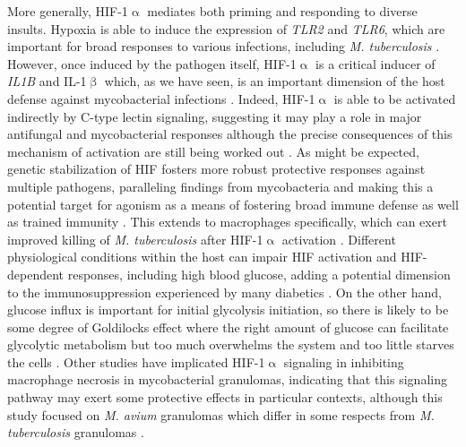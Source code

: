 More generally, HIF\hyp{}1$\upalpha$ mediates both priming and responding to diverse insults. Hypoxia is able to induce the expression of \textit{TLR2} and \textit{TLR6}, which are important for broad responses to various infections, including \textit{M. tuberculosis} \citep{Kuhlicke2007}. However, once induced by the pathogen itself, HIF\hyp{}1$\upalpha$ is a critical inducer of \textit{IL1B} and IL\hyp{}1$\upbeta$ which, as we have seen, is an important dimension of the host defense against mycobacterial infections \citep{Ogryzko2019}. Indeed, HIF\hyp{}1$\upalpha$ is able to be activated indirectly by C\hyp{}type lectin signaling, suggesting it may play a role in major antifungal and mycobacterial responses although the precise consequences of this mechanism of activation are still being worked out \citep{Friedrich2017, Elder2019}. As might be expected, genetic stabilization of HIF fosters more robust protective responses against multiple pathogens, paralleling findings from mycobacteria and making this a potential target for agonism as a means of fostering broad immune defense as well as trained immunity \citep{Schild2020}. This extends to macrophages specifically, which can exert improved killing of \textit{M. tuberculosis} after HIF\hyp{}1$\upalpha$ activation \citep{Li2021}. Different physiological conditions within the host can impair HIF activation and HIF\hyp{}dependent responses, including high blood glucose, adding a potential dimension to the immunosuppression experienced by many diabetics \citep{Teran2022}. On the other hand, glucose influx is important for initial glycolysis initiation, so there is likely to be some degree of Goldilocks effect where the right amount of glucose can facilitate glycolytic metabolism but too much overwhelms the system and too little starves the cells \citep{Stunault2018}. Other studies have implicated HIF\hyp{}1$\upalpha$ signaling in inhibiting macrophage necrosis in mycobacterial granulomas, indicating that this signaling pathway may exert some protective effects in particular contexts, although this study focused on \textit{M. avium} granulomas which differ in some respects from \textit{M. tuberculosis} granulomas \citep{Cardoso2015}.

